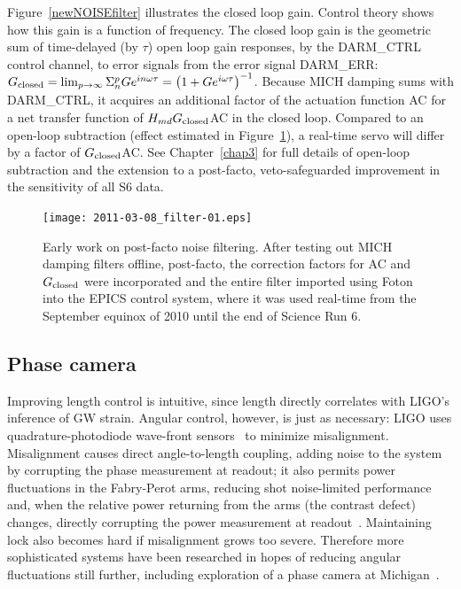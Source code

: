 Figure~\ref{newNOISEfilter} illustrates the closed loop gain.
Control theory shows how this gain is a function of frequency.
The closed loop gain is the geometric sum of time-delayed (by $\tau$) open loop gain responses, by the DARM\_CTRL control channel, to error signals from the error signal DARM\_ERR: $G_\textup{closed} = \lim_{p\rightarrow\infty} \Sigma_n^p G e^{i n \omega \tau} = \left(1 + G e^{i \omega \tau} \right)^{-1}$. 
Because MICH damping sums with DARM\_CTRL, it acquires an additional factor of the actuation function AC for a net transfer function of $H_{md} G_\textup{closed}$AC in the closed loop. 
Compared to an open-loop subtraction (effect estimated in Figure~\ref{filter_early}), a real-time servo will differ by a factor of $G_\textup{closed}$AC. 
See Chapter~\ref{chap3} for full details of open-loop subtraction and the extension to a post-facto, veto-safeguarded improvement in the sensitivity of all S6 data.

	\begin{figure}
	\begin{center}
	\texttt{[image: 2011-03-08\_filter-01.eps]}
	\caption{Early work on post-facto noise filtering. After testing out MICH damping filters offline, post-facto, the correction factors for AC and $G_\textup{closed}$ were incorporated and the entire filter imported using Foton into the EPICS control system, where it was used real-time from the September equinox of 2010 until the end of Science Run 6.}
	\label{filter_early}
	\end{center}
	\end{figure}

                \subsection{Phase camera}
                \label{phase_camera}

Improving length control is intuitive, since length directly correlates with LIGO's inference of GW strain.
Angular control, however, is just as necessary: LIGO uses quadrature-photodiode wave-front sensors~\cite{MavalvalaThesis} to minimize misalignment.
Misalignment causes direct angle-to-length coupling, adding noise to the system by corrupting the phase measurement at readout; it also permits power fluctuations in the Fabry-Perot arms, reducing shot noise-limited performance and, when the relative power returning from the arms (the contrast defect) changes, directly corrupting the power measurement at readout~\cite{DooleyThesis}.
Maintaining lock also becomes hard if misalignment grows too severe.
Therefore more sophisticated systems have been researched in hopes of reducing angular fluctuations still further, including exploration of a phase camera at Michigan~\cite{DergachevThesis}.

